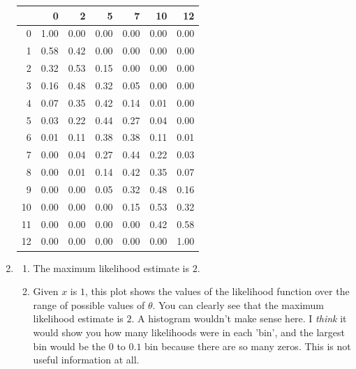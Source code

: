 \documentclass[12pt]{article}\usepackage[]{graphicx}\usepackage[]{color}
\begin{document}
\begin{doublespacing}
\begin{enumerate}
\begin{table}[ht]
\centering
\begin{tabular}{rrrrrrr}
  \hline
 & 0 & 2 & 5 & 7 & 10 & 12 \\ 
  \hline
0 & 1.00 & 0.00 & 0.00 & 0.00 & 0.00 & 0.00 \\ 
  1 & 0.58 & 0.42 & 0.00 & 0.00 & 0.00 & 0.00 \\ 
  2 & 0.32 & 0.53 & 0.15 & 0.00 & 0.00 & 0.00 \\ 
  3 & 0.16 & 0.48 & 0.32 & 0.05 & 0.00 & 0.00 \\ 
  4 & 0.07 & 0.35 & 0.42 & 0.14 & 0.01 & 0.00 \\ 
  5 & 0.03 & 0.22 & 0.44 & 0.27 & 0.04 & 0.00 \\ 
  6 & 0.01 & 0.11 & 0.38 & 0.38 & 0.11 & 0.01 \\ 
  7 & 0.00 & 0.04 & 0.27 & 0.44 & 0.22 & 0.03 \\ 
  8 & 0.00 & 0.01 & 0.14 & 0.42 & 0.35 & 0.07 \\ 
  9 & 0.00 & 0.00 & 0.05 & 0.32 & 0.48 & 0.16 \\ 
  10 & 0.00 & 0.00 & 0.00 & 0.15 & 0.53 & 0.32 \\ 
  11 & 0.00 & 0.00 & 0.00 & 0.00 & 0.42 & 0.58 \\ 
  12 & 0.00 & 0.00 & 0.00 & 0.00 & 0.00 & 1.00 \\ 
   \hline
\end{tabular}
\end{table}



\item \begin{enumerate} \item The maximum likelihood estimate is $2$. 

\item Given $x$ is $1$, this plot shows the values of the likelihood function over the range of possible values of $\theta$. You can clearly see that the maximum likelihood estimate is $2$. A histogram wouldn't make sense here. I {\it think} it would show you how many likelihoods were in each 'bin', and the largest bin would be the $0$ to $0.1$ bin because there are so many zeros. This is not useful information at all. 


\end{enumerate}
\end{enumerate}
\end{doublespacing}
\end{document}
